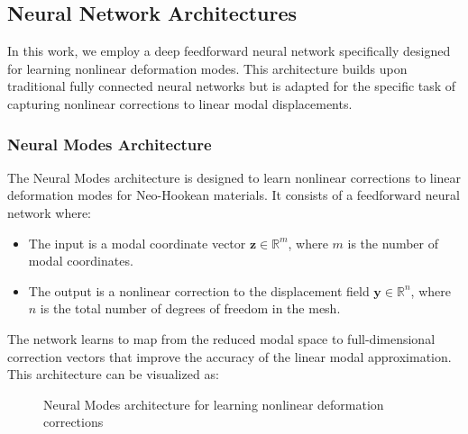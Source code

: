 \subsection{Neural Network Architectures}
In this work, we employ a deep feedforward neural network specifically designed for learning nonlinear deformation modes. This architecture builds upon traditional fully connected neural networks but is adapted for the specific task of capturing nonlinear corrections to linear modal displacements.

\subsubsection{Neural Modes Architecture}
The Neural Modes architecture is designed to learn nonlinear corrections to linear deformation modes for Neo-Hookean materials. It consists of a feedforward neural network where:

\begin{itemize}
    \item The input is a modal coordinate vector \( \bm{z} \in \mathbb{R}^m \), where $m$ is the number of modal coordinates.
    \item The output is a nonlinear correction to the displacement field \( \bm{y} \in \mathbb{R}^n \), where $n$ is the total number of degrees of freedom in the mesh.
\end{itemize}

The network learns to map from the reduced modal space to full-dimensional correction vectors that improve the accuracy of the linear modal approximation. This architecture can be visualized as:

\begin{figure}
    \centering
    \caption{Neural Modes architecture for learning nonlinear deformation corrections}
    \label{fig:neural_modes_arch}
\end{figure}

